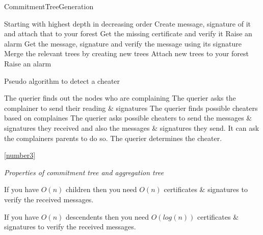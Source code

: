 \begin{algorithm}[H]\label{number3} \caption {CommitmentTreeGeneration}
	\begin {algorithmic}[1]
		\STATE Starting with highest depth in decreasing order 
				\STATE Create message, signature of it and attach that to your forest
									\STATE Get the missing certificate and verify it
											\STATE Raise an alarm
										\ENDIF
								\ELSE
									\STATE Get the message, signature and verify the message using its signature 
										\STATE Merge the relevant trees by creating new trees
										\STATE Attach new trees to your forest
									\ELSE
										\STATE Raise an alarm
									\ENDIF
								\ENDIF
							\ENDFOR
						\ENDFOR
					\ENDIF
			\ENDFOR
	\end{algorithmic}
\end{algorithm}

\begin{algorithm}
\caption{Pseudo algorithm to detect a cheater}
	\begin{algorithmic}[1]
			\STATE The querier finds out the nodes who are complaining 
			\STATE The querier asks the complainer to send their reading \& signatures
			\STATE The querier finds possible cheaters based on complaines
			\STATE The querier asks possible cheaters to send the messages \& signatures they received and also the messages \& signatures they send. It can ask the complainers parents to do so.
			\STATE The querier determines the cheater. 
	\end{algorithmic}
\end{algorithm}

\ref{number3}

\textit{Properties of commitment tree and aggregation tree}

	If you have $O(n)$ children then you need $O(n)$ certificates \& signatures to verify the received messages.

	If you have $O(n)$ descendents then you need $O(log(n))$ certificates \& signatures to verify the received messages.
